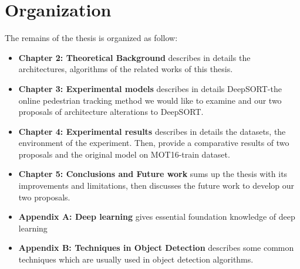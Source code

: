 \section{Organization}
The remains of the thesis is organized as follow:
\begin{itemize}[label={}]
  \item \textbf{Chapter 2: Theoretical Background} describes in details the architectures, algorithms of the related works of this thesis.
  \item \textbf{Chapter 3: Experimental models} describes in details DeepSORT\cite{Wojke2017simple}-the online pedestrian tracking method we would like to examine
  and our two proposals of architecture alterations to DeepSORT\cite{Wojke2017simple}.
  \item \textbf{Chapter 4: Experimental results} describes in details the datasets, the environment of the experiment. 
  Then, provide a comparative results of two proposals and the original model on MOT16-train dataset.
  \item \textbf{Chapter 5: Conclusions and Future work} sums up the thesis with its improvements and limitations, 
  then discusses the future work to develop our two proposals.
  \item \textbf{Appendix A: Deep learning} gives essential foundation knowledge of deep learning
  \item \textbf{Appendix B: Techniques in Object Detection} describes some common techniques which are usually used in object detection algorithms.
\end{itemize}